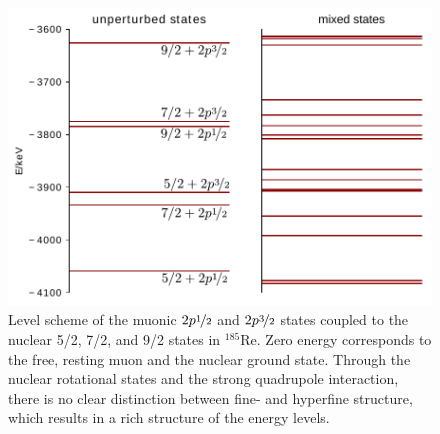 \begin{figure}%
\centering
\includegraphics[width=0.75\linewidth]{pics/quad2.pdf}%
\caption{Level scheme of the muonic $2p\nicefrac{1}{2}$ and $2p\nicefrac{3}{2}$ states coupled to the nuclear 5/2, 7/2, and 9/2  states in $^{185}$Re. Zero energy corresponds to the free, resting muon and the nuclear ground state. Through the nuclear rotational states and the strong quadrupole interaction, there is no clear distinction between fine- and hyperfine structure, which results in a rich structure of the energy levels.}%
\label{fig:quad2}%
\end{figure}
%

